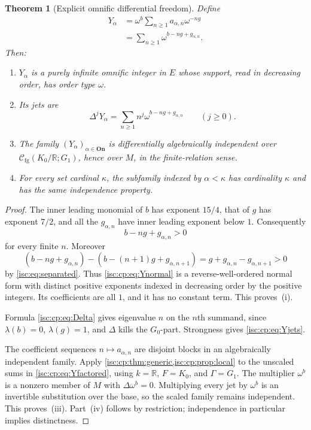 \documentclass[11pt,letterpaper]{article}
\newtheorem{theorem}{Theorem}[section]
\theoremstyle{definition}
\theoremstyle{remark}
\newcommand{\On}{\mathbf{On}}
\newcommand{\R}{\mathbb R}
\newcommand{\Cfg}{\mathcal C_{\mathrm{fg}}}
\numberwithin{equation}{section}
\begin{document}
\begin{theorem}[Explicit omnific differential freedom]\label{isc:cp:thm:omnific}
Define
\begin{align}
 Y_\alpha
 &=\omega^b\sum_{n\ge1}a_{\alpha,n}\omega^{-ng}\label{isc:cp:eq:Yfactored}\\
 &=\sum_{n\ge1}\omega^{b-ng+g_{\alpha,n}}.
 \label{isc:cp:eq:Ynormal}
\end{align}
Then:
\begin{enumerate}[label=\textup{(\roman*)}]
\item $Y_\alpha$ is a purely infinite omnific integer in $E$ whose support,
read in decreasing order, has order type $\omega$.
\item Its jets are
\begin{equation}\label{isc:cp:eq:Yjets}
 \Delta^jY_\alpha=\sum_{n\ge1}n^j\omega^{b-ng+g_{\alpha,n}}
 \qquad(j\ge0).
\end{equation}
\item The family $(Y_\alpha)_{\alpha\in\On}$ is differentially algebraically
independent over $\Cfg(K_0/\R;G_1)$, hence over $M$, in the finite-relation
sense.
\item For every set cardinal $\kappa$, the subfamily indexed by
$\alpha<\kappa$ has cardinality $\kappa$ and has the same independence
property.
\end{enumerate}
\end{theorem}
\begin{proof}
The inner leading monomial of $b$ has exponent $15/4$, that of $g$ has
exponent $7/2$, and all the $g_{\alpha,n}$ have inner leading exponent below
$1$. Consequently
\[
 b-ng+g_{\alpha,n}>0
\]
for every finite $n$. Moreover
\[
 (b-ng+g_{\alpha,n})-(b-(n+1)g+g_{\alpha,n+1})
   =g+g_{\alpha,n}-g_{\alpha,n+1}>0
\]
by \eqref{isc:eq:separated}. Thus \eqref{isc:cp:eq:Ynormal} is a
reverse-well-ordered normal form with distinct positive exponents indexed in
decreasing order by the positive integers. Its coefficients are all $1$,
and it has no constant term. This proves~(i).

Formula \eqref{isc:cp:eq:Delta} gives eigenvalue $n$ on the $n$th summand,
since $\lambda(b)=0$, $\lambda(g)=1$, and $\Delta$ kills the $G_0$-part.
Strongness gives \eqref{isc:cp:eq:Yjets}.

The coefficient sequences $n\mapsto a_{\alpha,n}$ are disjoint blocks in an
algebraically independent family. Apply
\cref{isc:cp:thm:generic,isc:cp:prop:local} to the unscaled sums in
\eqref{isc:cp:eq:Yfactored}, using $k=\R$, $F=K_0$, and $\Gamma=G_1$. The
multiplier $\omega^b$ is a nonzero member of $M$ with $\Delta\omega^b=0$.
Multiplying every jet by $\omega^b$ is an invertible substitution over the
base, so the scaled family remains independent. This proves~(iii).
Part~(iv) follows by restriction; independence in particular implies
distinctness.
\end{proof}
\end{document}

